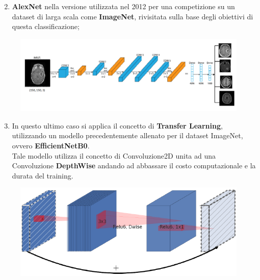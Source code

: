 \documentclass{beamer}
\begin{document}
\begin{frame}
	
	\begin{enumerate}
		\setcounter{enumi}{1}
		\item \textbf{AlexNet} nella versione utilizzata nel 2012 per una competizione su un dataset di larga scala come \textbf{ImageNet}, rivisitata sulla base degli obiettivi di questa classificazione;	
	\end{enumerate}
		\begin{figure}
			\includegraphics[width=1\textwidth]{AlexNet.PNG}
		\end{figure}
		
	
\end{frame}


	
\begin{frame}
	
	\begin{enumerate}
		\setcounter{enumi}{2}
		\item In questo ultimo caso si applica il concetto di \textbf{Transfer Learning}, utilizzando un modello precedentemente allenato per il dataset ImageNet,
		ovvero \textbf{EfficientNetB0}.\\
		Tale modello utilizza il concetto di Convoluzione2D unita ad una Convoluzione \textbf{DepthWise} andando ad abbassare il costo computazionale e la durata del training.
	\end{enumerate}
		\begin{figure}
			\includegraphics[width=1\textwidth]{efficientnet.png}
		\end{figure}
		
	
\end{frame}
\end{document}
